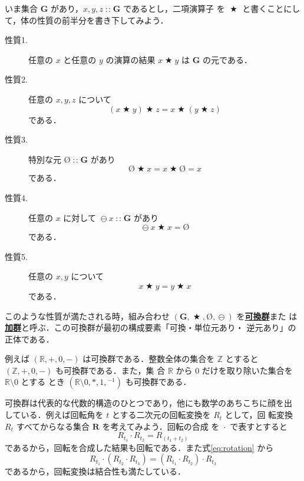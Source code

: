 \documentclass[a5paper,twoside,fleqn,draft]{jsbook}
\newcommand{\keyword}[1]{{\underline{\textbf{#1}}}}
\newcommand{\mZero}{\text{\O}}
\DeclareMathOperator{\mBinOp}{\bigstar}
\DeclareMathOperator{\mCompRot}{\cdot} %
\DeclareMathOperator{\mIn}{{:\!:}}
\DeclareMathOperator{\mMinus}{\ominus}
\newcommand{\mSet}[1]{\mathbf{#1}}
\newcommand{\mSpecialSet}[1]{\mathbb{#1}}
\newcommand{\mRSet}{\mSpecialSet{R}}
\newcommand{\mZSet}{\mSpecialSet{Z}}
\newcommand{\mTupleWith}[1]{\left(#1\right)}
\begin{document}
いま集合 $\mSet{G}$ があり，$x,y,z\mIn\mSet{G}$ であるとし，二項演算子
を $\mBinOp$ と書くことにして，体の性質の前半分を書き下してみよう．
\begin{description}
\item[性質1.] 任意の $x$ と任意の $y$ の演算の結果 $x\mBinOp y$ は
$\mSet{G}$ の元である．
\item[性質2.] 任意の $x,y,z$ について
\begin{equation}
(x\mBinOp y)\mBinOp z=x\mBinOp(y\mBinOp z)
\end{equation}
である．
\item[性質3.] 特別な元 $\mZero\mIn\mSet{G}$ があり
\begin{equation}
\mZero\mBinOp x=x\mBinOp\mZero=x
\end{equation}
である．
\item[性質4.] 任意の $x$ に対して $\mMinus x\mIn\mSet{G}$ があり
\begin{equation}
\mMinus x\mBinOp x=\mZero
\end{equation}
である．
\item[性質5.] 任意の $x,y$ について
\begin{equation}
x\mBinOp y=y\mBinOp x
\end{equation}
である．
\end{description}
このような性質が満たされる時，組み合わせ
$\mTupleWith{\mSet{G},\mBinOp,\mZero,\mMinus}$ を\keyword{可換群}また
は\keyword{加群}と呼ぶ．この可換群が最初の構成要素「可換・単位元あり・
逆元あり」の正体である．

例えば $\mTupleWith{\mRSet,+,0,-}$ は可換群である．整数全体の集合を
$\mZSet$ とすると $\mTupleWith{\mZSet,+,0,-}$ も可換群である．また，集
合 $\mRSet$ から $0$ だけを取り除いた集合を $\mRSet\setminus0$ とする
とき $\mTupleWith{\mRSet\setminus0,*,1,{}^{-1}}$ も可換群である．

可換群は代表的な代数的構造のひとつであり，他にも数学のあちこちに顔を出
している．例えば回転角を $t$ とする二次元の回転変換を $R_t$ として，回
転変換 $R_t$ すべてからなる集合 $\mSet{R}$ を考えてみよう．回転の合成
を $\mCompRot$ で表すとすると
\begin{equation}
\label{eq:rotation}
R_{t_1}\mCompRot R_{t_2}=R_{(t_1+t_2)}
\end{equation}
であるから，回転を合成した結果も回転である．また式\eqref{eq:rotation}
から
\begin{equation}
  R_{t_1}\mCompRot\left(R_{t_2}\mCompRot R_{t_3}\right)
  =\left(R_{t_1}\mCompRot R_{t_2}\right)\mCompRot R_{t_3}
\end{equation}
であるから，回転変換は結合性も満たしている．
\end{document}
